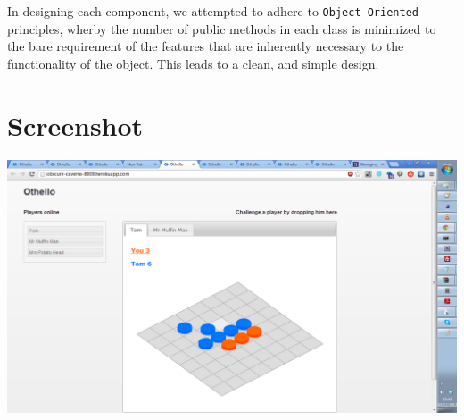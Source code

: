 \documentclass[a4wide, 11pt]{article}
\begin{document}
In designing each component, we attempted to adhere to \texttt{Object Oriented} principles, wherby the number of public methods in each class is minimized to the bare requirement of the features that are inherently necessary to the functionality of the object. This leads to a clean, and simple design.


\section{Screenshot}

\includegraphics[width=\textwidth]{Screenshot.png}
\end{document}

